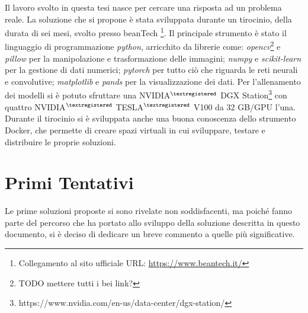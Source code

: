 Il lavoro svolto in questa tesi nasce per cercare una risposta ad un problema reale.
La soluzione che si propone è stata sviluppata durante un tirocinio, della durata di sei mesi, svolto presso beanTech \footnote{Collegamento al sito ufficiale URL: \url{https://www.beantech.it/}}.
Il principale strumento è stato il linguaggio di programmazione \textit{python}, arricchito da librerie come:
\textit{opencv}\footnote{TODO mettere tutti i bei link?} e \textit{pillow} per la manipolazione e trasformazione delle immagini; 
\textit{numpy} e \textit{scikit-learn} per la gestione di dati numerici;
\textit{pytorch} per tutto ciò che riguarda le reti neurali e convolutive;
\textit{matplotlib} e \textit{pands} per la visualizzazione dei dati.
Per l'allenamento dei modelli si è potuto sfruttare una NVIDIA$^{\tiny{\textregistered}}$ DGX Station\footnote{https://www.nvidia.com/en-us/data-center/dgx-station/} con quattro NVIDIA$^{\tiny{\textregistered}}$ TESLA$^{\tiny{\textregistered}}$ V100 da 32 GB/GPU l'una.
Durante il tirocinio si è sviluppata anche una buona conoscenza dello strumento Docker, che permette di creare spazi virtuali in cui sviluppare, testare e distribuire le proprie soluzioni.


\clearpage

\section{Primi Tentativi}
Le prime soluzioni proposte si sono rivelate non soddisfacenti, ma poiché fanno parte del percorso che ha portato allo sviluppo della soluzione descritta in questo documento, si è deciso di dedicare un breve commento a quelle più significative.

